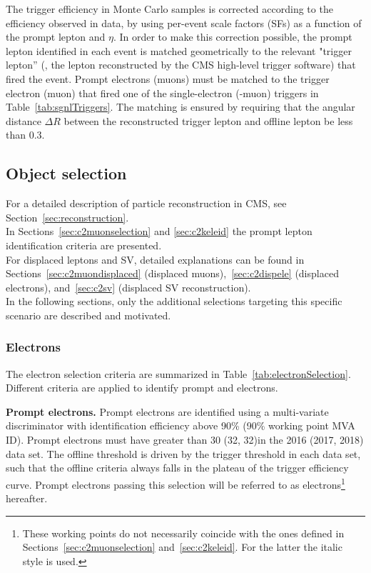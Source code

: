 The trigger efficiency in  Monte Carlo samples is corrected
according to the efficiency observed in data, by using per-event scale
factors (SFs) as a function of the prompt lepton \pt and $\eta$.
In order to make this correction possible, the prompt lepton
identified in each event is matched geometrically to the relevant
"trigger lepton'' (\ie, the lepton reconstructed by the CMS
high-level trigger software) that fired the event. Prompt electrons
(muons) must be matched to the trigger electron (muon) that fired one
of the single-electron (-muon) triggers in
Table~\ref{tab:sgnlTriggers}.
The matching is ensured by requiring that the angular distance
$\Delta R$ 
between the reconstructed trigger lepton and offline lepton be less
than 0.3. 

\subsection{Object selection}\label{sec:llobject}
For a detailed description of particle reconstruction in
CMS, see Section~\ref{sec:reconstruction}.\\
In Sections~\ref{sec:c2muonselection} and \ref{sec:c2keleid} the
prompt lepton identification criteria are presented.\\
For displaced leptons and SV, detailed explanations can be found in
Sections~\ref{sec:c2muondisplaced} (displaced
muons),~\ref{sec:c2dispele} (displaced electrons), and~\ref{sec:c2sv}
(displaced SV reconstruction).\\

In the following sections, only the
additional selections 
targeting this specific scenario are described and motivated.

\subsubsection{Electrons}\label{sec:llelectron}
The electron selection criteria are summarized in
Table~\ref{tab:electronSelection}. 
Different criteria are applied to identify prompt and \displ
electrons.

\textbf {Prompt electrons.}
Prompt electrons are identified using a multi-variate discriminator with identification efficiency above 90\%
(90\% working point MVA ID). Prompt electrons
must have \pt greater than 30 (32, 32)\GeV in the 2016 (2017, 2018)
data set.
The offline \pt threshold is driven by the trigger \pt threshold in
each data set, such that the offline criteria always falls in the plateau
of the trigger efficiency curve.
Prompt electrons passing this selection will be referred to as \tP electrons\footnote{
These working points do not necessarily coincide with the ones
defined in Sections~\ref{sec:c2muonselection}
and~\ref{sec:c2keleid}. For the latter the italic style is used.} hereafter.

